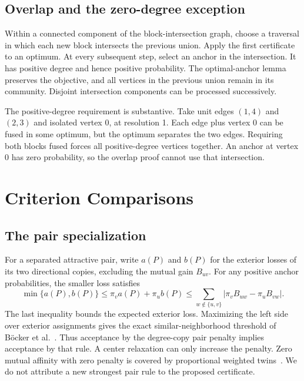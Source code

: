 \documentclass[sigconf,anonymous,review]{acmart}
\newcommand{\1}{\mathbf{1}}
\begin{document}
\subsection{Overlap and the zero-degree exception}
Within a connected component of the block-intersection graph, choose a traversal
in which each new block intersects the previous union. Apply the first
certificate to an optimum. At every subsequent step, select an anchor in the
intersection. It has positive degree and hence positive probability. The
optimal-anchor lemma preserves the objective, and all vertices in the previous
union remain in its community. Disjoint intersection components can be
processed successively.

The positive-degree requirement is substantive. Take unit edges $(1,4)$ and
$(2,3)$ and isolated vertex 0, at resolution 1. Each edge plus vertex 0 can be
fused in some optimum, but the optimum separates the two edges. Requiring both
blocks fused forces all positive-degree vertices together. An anchor at vertex 0
has zero probability, so the overlap proof cannot use that intersection.

\section{Criterion Comparisons}\label{app:comparison}
\subsection{The pair specialization}
For a separated attractive pair, write $a(P)$ and $b(P)$ for the exterior
losses of its two directional copies, excluding the mutual gain $B_{uv}$.
For any positive anchor probabilities, the smaller loss satisfies
\[
 \min\{a(P),b(P)\}\leq\pi_v a(P)+\pi_u b(P)
 \leq\sum_{w\notin\{u,v\}}|\pi_vB_{uw}-\pi_uB_{vw}|.
\]
The last inequality bounds the expected exterior loss. Maximizing the left
side over exterior assignments gives the exact similar-neighborhood threshold
of B\"ocker et al.~\cite{bocker2011exact}. Thus acceptance by the degree-copy
pair penalty implies acceptance by that rule. A center relaxation can only
increase the penalty. Zero mutual affinity with zero penalty is covered by
proportional weighted twins~\cite{blasius2022branch}. We do not attribute a
new strongest pair rule to the proposed certificate.
\end{document}

